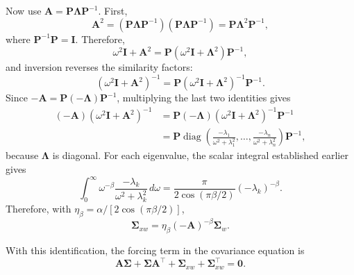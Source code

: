 \documentclass[12pt]{article}
\begin{document}
Now use $\mathbf A=\mathbf P\boldsymbol\Lambda\mathbf P^{-1}$. First,
\begin{equation}
\mathbf A^2
=(\mathbf P\boldsymbol\Lambda\mathbf P^{-1})(\mathbf P\boldsymbol\Lambda\mathbf P^{-1})
=\mathbf P\boldsymbol\Lambda^2\mathbf P^{-1},
\label{eq:Sigma_xw_A_squared}
\end{equation}
where $\mathbf P^{-1}\mathbf P=\mathbf I$. Therefore,
\begin{equation}
\omega^2\mathbf I+\mathbf A^2
=\mathbf P(\omega^2\mathbf I+\boldsymbol\Lambda^2)\mathbf P^{-1},
\label{eq:Sigma_xw_shifted}
\end{equation}
and inversion reverses the similarity factors:
\begin{equation}
(\omega^2\mathbf I+\mathbf A^2)^{-1}
=\mathbf P(\omega^2\mathbf I+\boldsymbol\Lambda^2)^{-1}\mathbf P^{-1}.
\label{eq:Sigma_xw_inverse}
\end{equation}
Since $-\mathbf A=\mathbf P(-\boldsymbol\Lambda)\mathbf P^{-1}$, multiplying the last two identities gives
\begin{equation}
\begin{aligned}
(-\mathbf A)(\omega^2\mathbf I+\mathbf A^2)^{-1}
&=\mathbf P(-\boldsymbol\Lambda)(\omega^2\mathbf I+\boldsymbol\Lambda^2)^{-1}\mathbf P^{-1}\\
&=\mathbf P\operatorname{diag}\!\left(
\frac{-\lambda_1}{\omega^2+\lambda_1^2},\ldots,
\frac{-\lambda_n}{\omega^2+\lambda_n^2}\right)\mathbf P^{-1},
\end{aligned}
\label{eq:Sigma_xw_diagonal}
\end{equation}
because $\boldsymbol\Lambda$ is diagonal.
For each eigenvalue, the scalar integral established earlier gives
\begin{equation}
\int_{0}^{\infty}\omega^{-\beta}
\frac{-\lambda_k}{\omega^2+\lambda_k^2}\,d\omega
=\frac{\pi}{2\cos(\pi\beta/2)}(-\lambda_k)^{-\beta}.
\label{eq:Sigma_xw_scalar}
\end{equation}
Therefore, with $\eta_\beta=\alpha/[2\cos(\pi\beta/2)]$,
\begin{equation}
    \boldsymbol{\Sigma}_{xw}
    =\eta_\beta(-\mathbf A)^{-\beta}\boldsymbol{\Sigma}_w .
    \label{eq:Sigma_xw_closed}
\end{equation}

With this identification, the forcing term in the covariance equation is
\begin{equation}
    \mathbf A\boldsymbol{\Sigma}+\boldsymbol{\Sigma}\mathbf A^\top
    +\boldsymbol{\Sigma}_{xw}+\boldsymbol{\Sigma}_{xw}^{\top}
    =\mathbf 0 .
    \label{eq:lyap_cross_covariance}
\end{equation}
\end{document}
